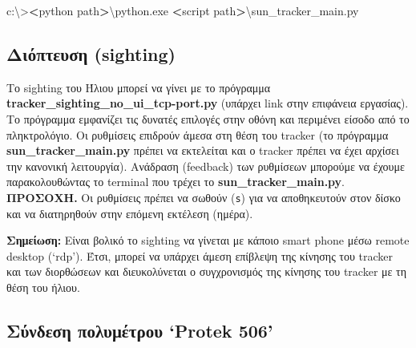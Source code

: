 \documentclass[
  a4paper,
  twoside,
  titlepage,
  12pt]{article}
\newenvironment{Shaded}{\begin{snugshade}}{\end{snugshade}}
\newcommand{\DataTypeTok}[1]{\textcolor[rgb]{0.13,0.29,0.53}{#1}}
\newcommand{\ExtensionTok}[1]{#1}
\newcommand{\NormalTok}[1]{#1}
\newcommand{\OperatorTok}[1]{\textcolor[rgb]{0.81,0.36,0.00}{\textbf{#1}}}
\numberwithin{equation}{section}
\numberwithin{figure}{section}
\numberwithin{table}{section}
\begin{document}
\begin{Shaded}
\begin{Highlighting}[]
\ExtensionTok{c:\textbackslash{}\textgreater{}}\OperatorTok{\textless{}}\NormalTok{python path}\OperatorTok{\textgreater{}}\DataTypeTok{\textbackslash{}p}\NormalTok{ython.exe }\OperatorTok{\textless{}}\NormalTok{script path}\OperatorTok{\textgreater{}}\DataTypeTok{\textbackslash{}s}\NormalTok{un\_tracker\_main.py}
\end{Highlighting}
\end{Shaded}

\vspace{-1.05\baselineskip}

\hypertarget{ux3b4ux3b9ux3ccux3c0ux3c4ux3b5ux3c5ux3c3ux3b7-sighting}{%
\subsection*{Διόπτευση (sighting)}\label{ux3b4ux3b9ux3ccux3c0ux3c4ux3b5ux3c5ux3c3ux3b7-sighting}}

\vspace{-0.6\baselineskip}

Το sighting του Ήλιου μπορεί να γίνει με το πρόγραμμα \textbf{tracker\_sighting\_no\_ui\_tcp-port.py} (υπάρχει link στην επιφάνεια εργασίας).
Το πρόγραμμα εμφανίζει τις δυνατές επιλογές στην οθόνη και περιμένει είσοδο από το πληκτρολόγιο.
Οι ρυθμίσεις επιδρούν άμεσα στη θέση του tracker (το πρόγραμμα \textbf{sun\_tracker\_main.py} πρέπει να εκτελείται και ο tracker πρέπει να έχει αρχίσει την κανονική λειτουργία).
Ανάδραση (feedback) των ρυθμίσεων μπορούμε να έχουμε παρακολουθώντας το terminal που τρέχει το \textbf{sun\_tracker\_main.py}. \textbf{ΠΡΟΣΟΧΗ.} Οι ρυθμίσεις πρέπει να σωθούν (\texttt{\textquotesingle{}s\textquotesingle{}}) για να αποθηκευτούν στον δίσκο και να διατηρηθούν στην επόμενη εκτέλεση (ημέρα).

\textbf{Σημείωση:} Είναι βολικό το sighting να γίνεται με κάποιο smart phone μέσω remote desktop (`rdp').
Έτσι, μπορεί να υπάρχει άμεση επίβλεψη της κίνησης του tracker και των διορθώσεων και διευκολύνεται ο συγχρονισμός της κίνησης του tracker με τη θέση του ήλιου.

\vspace{-1.05\baselineskip}

\hypertarget{ux3c3ux3cdux3bdux3b4ux3b5ux3c3ux3b7-ux3c0ux3bfux3bbux3c5ux3bcux3adux3c4ux3c1ux3bfux3c5-protek-506}{%
\subsection*{Σύνδεση πολυμέτρου `Protek 506'}\label{ux3c3ux3cdux3bdux3b4ux3b5ux3c3ux3b7-ux3c0ux3bfux3bbux3c5ux3bcux3adux3c4ux3c1ux3bfux3c5-protek-506}}
\end{document}
